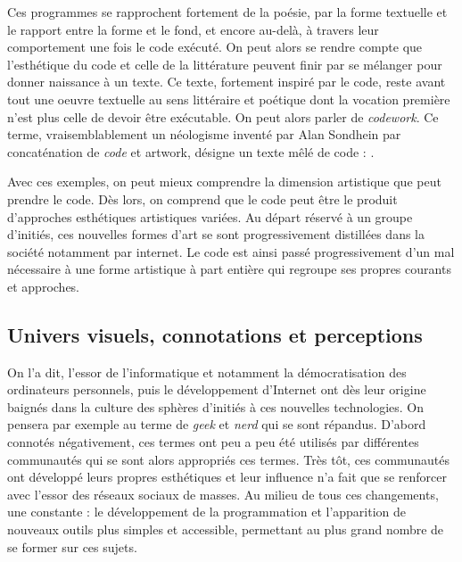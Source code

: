 \documentclass[12pt]{article} %
\begin{document}
Ces programmes se rapprochent fortement de la poésie, par la forme textuelle et le rapport entre la forme et le fond, et encore au-delà, à travers leur comportement une fois le code exécuté. On peut alors se rendre compte que l'esthétique du code et celle de la littérature peuvent finir par se mélanger pour donner naissance à un texte. Ce texte, fortement inspiré par le code, reste avant tout une oeuvre textuelle au sens littéraire et poétique dont la vocation première n'est plus celle de devoir être exécutable. On peut alors parler de \textit{codework}. Ce terme, vraisemblablement un néologisme inventé par Alan Sondhein par concaténation de \textit{code} et {artwork}, désigne un texte mêlé de code :  \cite{ELO-ContentByKeyword}. 



Avec ces exemples, on peut mieux comprendre la dimension artistique que peut prendre le code. Dès lors, on comprend que le code peut être le produit d'approches esthétiques artistiques variées. Au départ réservé à un groupe d'initiés, ces nouvelles formes d'art se sont progressivement distillées dans la société notamment par internet. Le code est ainsi passé progressivement d'un mal nécessaire à une forme artistique à part entière qui regroupe ses propres courants et approches.

\subsection{Univers visuels, connotations et perceptions}
On l'a dit, l'essor de l'informatique et notamment la démocratisation des ordinateurs personnels, puis le développement d'Internet ont dès leur origine baignés dans la culture des sphères d'initiés à ces nouvelles technologies. On pensera par exemple au terme de \textit{geek} et \textit{nerd} qui se sont répandus. D'abord connotés négativement, ces termes ont peu a peu été utilisés par différentes communautés qui se sont alors appropriés ces termes. Très tôt, ces communautés ont développé leurs propres esthétiques et leur influence n'a fait que se renforcer avec l'essor des réseaux sociaux de masses. Au milieu de tous ces changements, une constante : le développement de la programmation et l'apparition de nouveaux outils plus simples et accessible, permettant au plus grand nombre de se former sur ces sujets.
\end{document}
